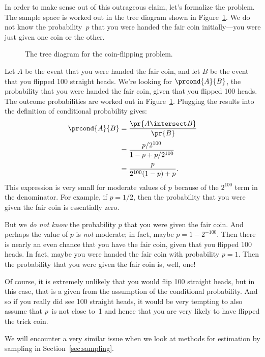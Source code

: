 In order to make sense out of this outrageous claim, let's formalize
the problem.  The sample space is worked out in the tree diagram shown
in Figure~\ref{fig:15C2}.  We do not know the probability~$p$ that you
were handed the fair coin initially---you were just given one coin or
the other.
%
\begin{figure}[h]


\caption{The tree diagram for the coin-flipping problem.}

\label{fig:15C2}

\end{figure}
%
Let $A$ be the event that you were handed the fair coin, and let $B$
be the event that you flipped 100 straight heads.  We're looking
for $\prcond{A}{B}$, the probability that you were handed the fair
coin, given that you flipped 100 heads.  The outcome probabilities are
worked out in Figure~\ref{fig:15C2}.  Plugging the results into the
definition of conditional probability gives:
%
\begin{align*}
\prcond{A}{B}	& = \frac{\pr{A \intersect B}}{\pr{B}} \\[2pt]
		& = \frac{p / 2^{100}}{1 - p + p / 2^{100}} \\[2pt]
		& = \frac{p}{2^{100} (1 - p) + p}.
\end{align*}
%
This expression is very small for moderate values of $p$ because of
the $2^{100}$ term in the denominator.  For example, if $p = 1/2$,
then the probability that you were given the fair coin is essentially
zero.

But we \emph{do not know} the probability $p$ that you were given
the fair coin.  And perhaps the value of $p$ is \emph{not} moderate;
in fact, maybe $p = 1 - 2^{-100}$.  Then there is nearly an even
chance that you have the fair coin, given that you flipped 100 heads.
In fact, maybe you were handed the fair coin with probability $p = 1$.
Then the probability that you were given the fair coin is, well, one!

Of course, it is extremely unlikely that you would flip 100 straight
heads, but in this case, that is a given from the assumption of the
conditional probability.  And so if you really did see 100 straight
heads, it would be very tempting to also assume that $p$~is not close
to~1 and hence that you are very likely to have flipped the trick
coin.

We will encounter a very similar issue when we look at methods for
estimation by sampling in Section~\ref{sec:sampling}.
\fi

